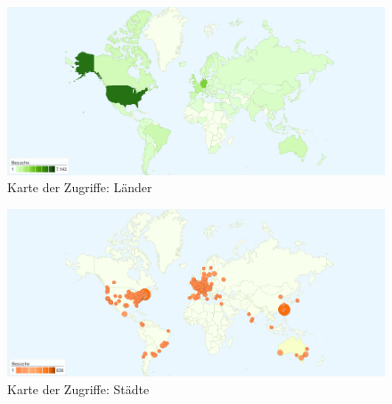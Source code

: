 \begin{figure}[htbp]
  \begin{center}
    \includegraphics[width=\textwidth]{usage/countrymap.png}
  \end{center}
  \caption{Karte der Zugriffe: Länder}
\end{figure}

\begin{figure}[htbp]
  \begin{center}
    \includegraphics[width=\textwidth]{usage/citymap.png}
  \end{center}
  \caption{Karte der Zugriffe: Städte}
\end{figure}


